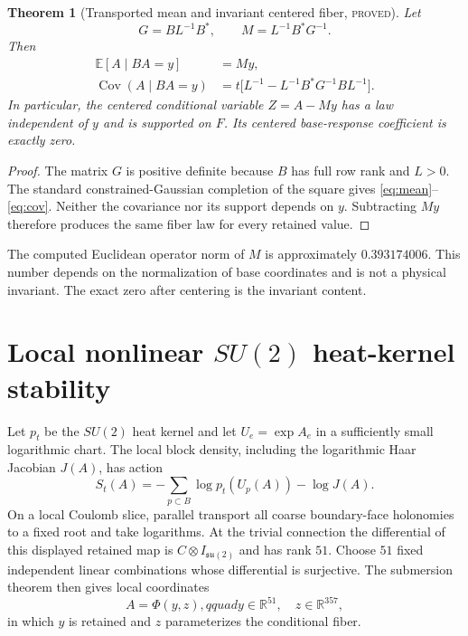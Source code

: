 \documentclass[11pt]{article}
\newcommand{\proved}{\textcolor{provedgreen}{\textsc{proved}}}
\newcommand{\R}{\mathbb R}
\newcommand{\E}{\mathbb E}
\newcommand{\su}{\mathfrak{su}(2)}
\newtheorem{theorem}[definition]{Theorem}
\theoremstyle{remark}
\begin{document}
\begin{theorem}[Transported mean and invariant centered fiber, \proved]
\label{thm:gaussian}
Let
\[
 G=BL^{-1}B^*,
 \qquad M=L^{-1}B^*G^{-1}.
\]
Then
\begin{align}
 \E[A\mid BA=y]&=My,\label{eq:mean}\\
 \operatorname{Cov}(A\mid BA=y)
 &=t\bigl[L^{-1}-L^{-1}B^*G^{-1}BL^{-1}\bigr].\label{eq:cov}
\end{align}
In particular, the centered conditional variable
$Z=A-My$ has a law independent of $y$ and is supported on $F$.  Its centered
base-response coefficient is exactly zero.
\end{theorem}
\begin{proof}
The matrix $G$ is positive definite because $B$ has full row rank and $L>0$.
The standard constrained-Gaussian completion of the square gives
\eqref{eq:mean}--\eqref{eq:cov}.  Neither the covariance nor its support
depends on $y$.  Subtracting $My$ therefore produces the same fiber law for
every retained value.
\end{proof}

The computed Euclidean operator norm of $M$ is approximately $0.393174006$.
This number depends on the normalization of base coordinates and is not a
physical invariant.  The exact zero after centering is the invariant content.

\section{Local nonlinear \texorpdfstring{$SU(2)$}{SU(2)} heat-kernel stability}

Let $p_t$ be the $SU(2)$ heat kernel and let $U_e=\exp A_e$ in a sufficiently
small logarithmic chart.  The local block density, including the logarithmic
Haar Jacobian $J(A)$, has action
\begin{equation}\label{eq:action}
 S_t(A)=-\sum_{p\subset B}\log p_t(U_p(A))-\log J(A).
\end{equation}
On a local Coulomb slice, parallel transport all coarse boundary-face
holonomies to a fixed root and take logarithms.  At the trivial connection the
differential of this displayed retained map is $C\otimes I_{\su}$ and has rank
$51$.  Choose $51$ fixed independent linear combinations whose differential
is surjective.  The submersion theorem then gives local coordinates
\[
 A=\Phi(y,z),qquad y\in\R^{51},\quad z\in\R^{357},
\]
in which $y$ is retained and $z$ parameterizes the conditional fiber.
\end{document}
